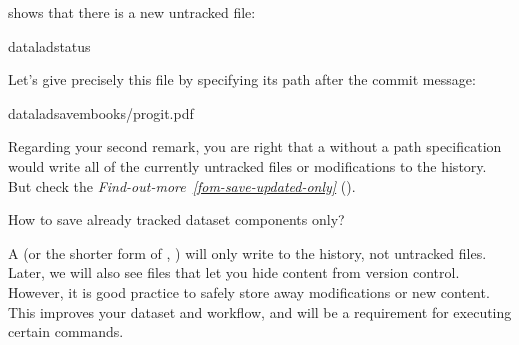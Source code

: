 \sphinxAtStartPar
{} shows that there is a new untracked file:

\begin{sphinxVerbatim}[commandchars=\\\{\}]
dataladstatus
\end{sphinxVerbatim}

\sphinxAtStartPar
Let’s give  precisely this file by specifying its path after the commit message:

\begin{sphinxVerbatim}[commandchars=\\\{\}]
dataladsave\PYGZhy{}mbooks/progit.pdf
\end{sphinxVerbatim}

\sphinxAtStartPar
Regarding your second remark, you are right that a  without a
path specification would write all of the currently untracked files or modifications
to the history. But check the \textit{Find-out-more}~{\findoutmoreiconinline}\textit{\ref{fom-save-updated-only}} {\hyperref[\detokenize{basics/101-102-populate:fom-save-updated-only}]{}} ().

\ignorespaces \begin{findoutmore}[label={fom-save-updated-only}, before title={\thetcbcounter\ }, float, floatplacement=tb, check odd page=true]{How to save already tracked dataset components only?}
\label{\detokenize{basics/101-102-populate:fom-save-updated-only}}

\sphinxAtStartPar
A  (or the shorter
form of , ) will only write  to the
history, not untracked files. Later, we will also see  files
that let you hide content from version control.  However, it is good
practice to safely store away modifications or new content.  This improves
your dataset and workflow, and will be a requirement for executing certain
commands.


\end{findoutmore}

